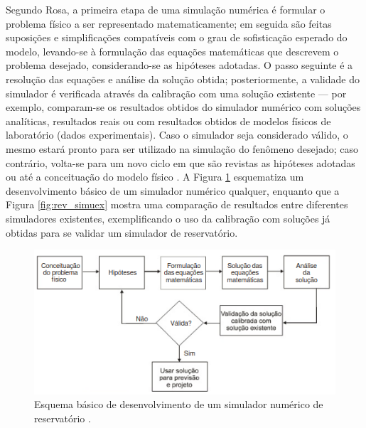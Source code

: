 Segundo Rosa, a primeira etapa de uma simula\c{c}\~{a}o num\'{e}rica \'{e} formular o problema f\'{i}sico a ser representado matematicamente; em seguida s\~{a}o feitas suposi\c{c}\~{o}es e simplifica\c{c}\~{o}es compat\'{i}veis com o grau de sofistica\c{c}\~{a}o esperado do modelo, levando-se \`{a} formula\c{c}\~{a}o das equa\c{c}\~{o}es matem\'{a}ticas que descrevem o problema desejado, considerando-se as hip\'{o}teses adotadas. O passo seguinte \'{e} a resolu\c{c}\~{a}o das equa\c{c}\~{o}es e an\'{a}lise da solu\c{c}\~{a}o obtida; posteriormente, a validade do simulador \'{e} verificada atrav\'{e}s da calibra\c{c}\~{a}o com uma solu\c{c}\~{a}o existente --- por exemplo, comparam-se os resultados obtidos do simulador num\'{e}rico com solu\c{c}\~{o}es anal\'{i}ticas, resultados reais ou com resultados obtidos de modelos f\'{i}sicos de laborat\'{o}rio (dados experimentais). Caso o simulador seja considerado v\'{a}lido, o mesmo estar\'{a} pronto para ser utilizado na simula\c{c}\~{a}o do fen\^{o}meno desejado; caso contr\'{a}rio, volta-se para um novo ciclo em que s\~{a}o revistas as hip\'{o}teses adotadas ou at\'{e} a conceitua\c{c}\~{a}o do modelo f\'{i}sico \cite[p. 520]{engres}. A Figura \ref{fig:rev_simuesq} esquematiza um desenvolvimento b\'{a}sico de um simulador num\'{e}rico qualquer, enquanto que a Figura \ref{fig:rev_simuex} mostra uma compara\c{c}\~{a}o de resultados entre diferentes simuladores existentes, exemplificando o uso da calibra\c{c}\~{a}o com solu\c{c}\~{o}es j\'{a} obtidas para se validar um simulador de reservat\'{o}rio. 

\begin{figure}[H]
\centering
\includegraphics[width=.75\textwidth]{figs/revisao/revisao_simuesq.png}
\caption{Esquema b\'{a}sico de desenvolvimento de um simulador num\'{e}rico de reservat\'{o}rio \cite[p. 519]{engres}.}\label{fig:rev_simuesq}
\end{figure}


